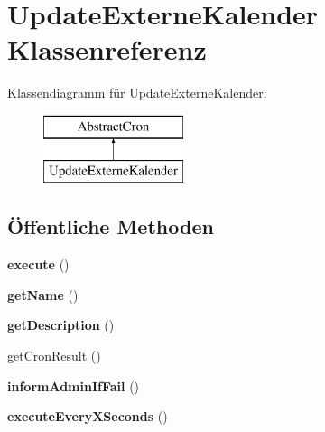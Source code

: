\hypertarget{class_update_externe_kalender}{}\section{Update\+Externe\+Kalender Klassenreferenz}
\label{class_update_externe_kalender}
Klassendiagramm für Update\+Externe\+Kalender\+:\begin{figure}[H]
\begin{center}
\leavevmode
\includegraphics[height=2.000000cm]{class_update_externe_kalender}
\end{center}
\end{figure}
\subsection*{Öffentliche Methoden}
\begin{DoxyCompactItemize}
\item 
\mbox{\label{class_update_externe_kalender_ac01c91ef8633d348690689b0ab82339f}} 
{\bfseries execute} ()
\item 
\mbox{\label{class_update_externe_kalender_a416054a9d4ad9979d04d4a829e6d8e25}} 
{\bfseries get\+Name} ()
\item 
\mbox{\label{class_update_externe_kalender_a00ac0f669daca409054fca88efaa765f}} 
{\bfseries get\+Description} ()
\item 
\mbox{\hyperlink{class_update_externe_kalender_a139a9b026de6d9c9ea763336a06f8f1f}{get\+Cron\+Result}} ()
\item 
\mbox{\label{class_update_externe_kalender_a06af891858b0d38afb9d16a6f319cb5e}} 
{\bfseries inform\+Admin\+If\+Fail} ()
\item 
\mbox{\label{class_update_externe_kalender_a25d8c37b618413cf3d0f586fd1a7570b}} 
{\bfseries execute\+Every\+X\+Seconds} ()
\end{DoxyCompactItemize}


